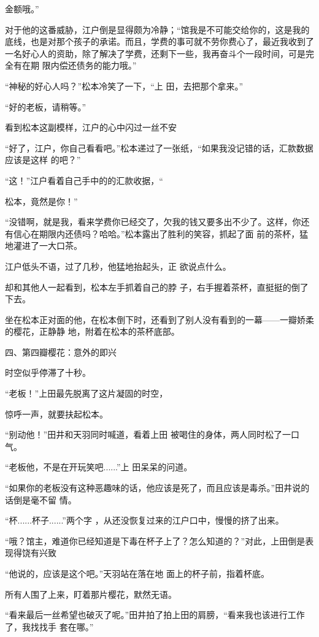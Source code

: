 \documentclass{article}
\begin{document}
\newpage
金额哦。” 

对于他的这番威胁，江户倒是显得颇为冷静；“馆我是不可能交给你的，这是我的底线，也是对那个孩子的承诺。而且，学费的事可就不劳你费心了，最近我收到了一名好心人的资助，除了解决了学费，还剩下一些，我再奋斗个一段时间，可是完全有在期
限内偿还债务的能力哦。” 

“神秘的好心人吗？”松本冷笑了一下，“上
田，去把那个拿来。” 


“好的老板，请稍等。” 

看到松本这副模样，江户的心中闪过一丝不安

“好了，江户，你自己看看吧。”松本递过了一张纸，“如果我没记错的话，汇款数据应该是这样
的吧？” 

“这！”江户看着自己手中的的汇款收据，“

\newpage
松本，竟然是你！” 

“没错啊，就是我，看来学费你已经交了，欠我的钱又要多出不少了。这样，你还有信心在期限内还债吗？哈哈。”松本露出了胜利的笑容，抓起了面
前的茶杯，猛地灌进了一大口茶。 

江户低头不语，过了几秒，他猛地抬起头，正
欲说点什么。 

却和其他人一起看到，松本左手抓着自己的脖
子，右手握着茶杯，直挺挺的倒了下去。 

坐在松本正对面的他，在松本倒下时，还看到了别人没有看到的一幕——一瓣娇柔的樱花，正静静
地，附着在松本的茶杯底部。 


四、第四瓣樱花：意外的即兴 


时空似乎停滞了十秒。 

“老板！”上田最先脱离了这片凝固的时空，
\newpage

惊呼一声，就要扶起松本。 

“别动他！”田井和天羽同时喊道，看着上田
被喝住的身体，两人同时松了一口气。 

“老板他，不是在开玩笑吧......”上
田呆呆的问道。 

“如果你的老板没有这种恶趣味的话，他应该是死了，而且应该是毒杀。”田井说的话倒是毫不留
情。 

“杯......杯子......”两个字
，从还没恢复过来的江户口中，慢慢的挤了出来。 

“哦？馆主，难道你已经知道是下毒在杯子上了？怎么知道的？”对此，上田倒是表现得饶有兴致

“他说的，应该是这个吧。”天羽站在落在地
面上的杯子前，指着杯底。 

\newpage

所有人围了上来，盯着那片樱花，默然无语。

“看来最后一丝希望也破灭了呢。”田井拍了拍上田的肩膀，“看来我也该进行工作了，我找找手
套在哪。” 
\end{document}
